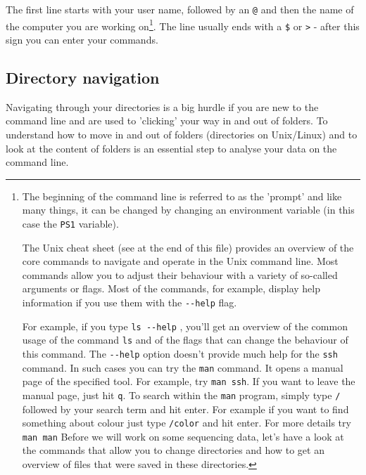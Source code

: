 \documentclass[11pt]{article}
\begin{document}
The first line starts with your user name, followed by an \texttt{@} and then
the name of the computer you are working on\footnote{The beginning of the command line is referred to as the 'prompt' and
like many things, it can be changed by
changing an environment variable (in this case the \texttt{PS1} variable).

The Unix cheat sheet (see at the end of this file) provides an
overview of the core commands to navigate and operate in the Unix
command line. Most commands allow you to adjust their behaviour with a
variety of so-called arguments or flags. Most of the commands, for
example, display help information if you use them with the \texttt{-{}-help}
flag.

For example, if you type \texttt{ls -{}-help} \footnotemark, you'll get an overview of the
common usage of the command \texttt{ls} and of the flags that can change the
behaviour of this command.  The \texttt{-{}-help} option doesn't provide much
help for the \texttt{ssh} command. In such cases you can try the \texttt{man}
command. It opens a manual page of the specified tool. For example,
try \texttt{man ssh}. If you want to leave the manual page, just hit \texttt{q}.
To search within the \texttt{man} program, simply type \texttt{/} followed by your search
term and hit enter. For example if you want to find something about colour
just type \texttt{/color} and hit enter\footnotemark. For more details try \texttt{man man}
Before we will work on some sequencing data, let's have a look
at the commands that allow you to change directories and how to get an
overview of files that were saved in these directories.}. The line usually ends with a
\texttt{\$} or \texttt{>} - after this sign you can enter your commands.

\subsection{Directory navigation}
\label{sec-2-1}
Navigating through your directories\footnotemark[5]{} is a big hurdle if you are new to
the command line and are used to 'clicking' your way in and out of folders. To
understand how to move in and out of folders (directories on Unix/Linux) and to look at the
content of folders is an essential step to analyse your data on
the command line.
\end{document}

